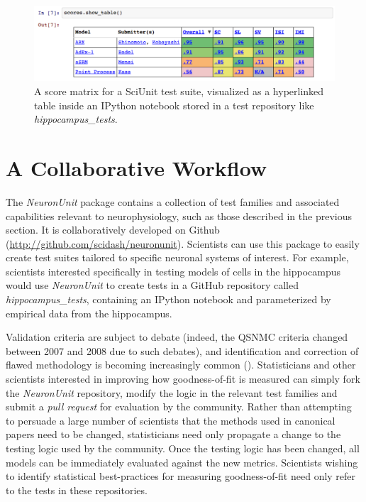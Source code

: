 \documentclass{frontiersSCNS}
\begin{document}
\begin{figure}%
\vspace{-5px}
\centering
\includegraphics[scale=0.55]{table-ipy.pdf}
\vspace{-10px}
\caption{A score matrix for a SciUnit test suite, visualized as a hyperlinked table inside an IPython notebook stored in a test repository like \textit{hippocampus\_tests}.}
\label{fig:scidash_matrix}
\vspace{-5px}
\end{figure}

\section{A Collaborative Workflow}\label{sec:neuronunit_acitivities}
The \textit{NeuronUnit} package contains a collection of test families and associated capabilities relevant to neurophysiology, such as those described in the previous section. 
It is collaboratively developed on Github (\url{http://github.com/scidash/neuronunit}). 
Scientists can use this package to easily create test suites tailored to specific neuronal systems of interest. 
For example, scientists interested specifically in testing models of cells in the hippocampus would use \textit{NeuronUnit} to create tests in a GitHub repository called \textit{hippocampus\_tests}, containing an IPython notebook and parameterized by empirical data from the hippocampus.%

Validation criteria are subject to debate (indeed, the QSNMC criteria changed between 2007 and 2008 due to such debates), and 
identification and correction of flawed methodology is becoming increasingly common (\cite{button_power_2013,kriegeskorte_circular_2009,galbraith_study_2010}). Statisticians and other scientists interested in improving how goodness-of-fit is measured can simply fork the \textit{NeuronUnit} repository, modify the logic in the relevant test families and submit a \emph{pull request} for evaluation by the community. 
Rather than attempting to persuade a large number of scientists that the methods used in canonical papers need to be changed, statisticians need only propagate a change to the testing logic used by the community. 
Once the testing logic has been changed, all models can be immediately evaluated against the new metrics. 
Scientists wishing to identify statistical best-practices for measuring goodness-of-fit need only refer to the tests in these repositories.
\end{document}
